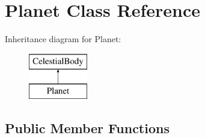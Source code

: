 \hypertarget{classPlanet}{
\section{Planet Class Reference}
\label{d5/dec/classPlanet}
}
Inheritance diagram for Planet:\begin{figure}[H]
\begin{center}
\leavevmode
\includegraphics[height=2cm]{d5/dec/classPlanet}
\end{center}
\end{figure}
\subsection*{Public Member Functions}
